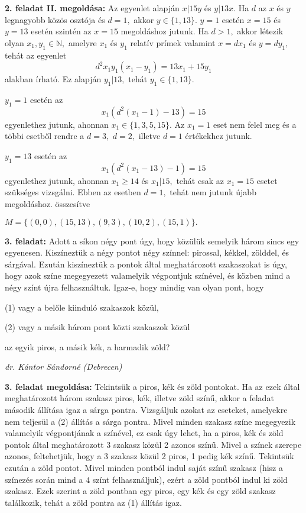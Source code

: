 \documentclass[a4paper,10pt]{article}
\def\ki#1#2{\hfill {\it #1 (#2)}\medskip}
\begin{document}
\textbf{2. feladat II. megoldása: } Az egyenlet alapján $x|15y$
és $y|13x.$ Ha $d$ az $x$ és $y$ legnagyobb közös osztója
és $d=1,$ akkor $y\in \{1,13\}.$ $y=1$ esetén $x=15$ és $y=13$
esetén szintén az $x=15$ megoldáshoz jutunk. Ha $d>1,$ akkor
létezik olyan $x_1,y_1\in \mathbb{N},$ amelyre $x_1$ és $y_1$
relatív prímek valamint  $x=dx_1$ és $y=dy_1,$ tehát az
egyenlet $$d^2x_1y_1(x_1-y_1)=13x_1+15y_1$$ alakban írható. Ez
alapján $y_1|13,$ tehát $y_1\in \{1,13\}.$

$y_1=1$ esetén az $$x_1\left(d^2(x_1-1)-13 \right )=15$$
egyenlethez jutunk, ahonnan $x_1\in \{1,3,5,15\}.$ Az $x_1=1$ eset
nem felel meg és a többi esetből rendre a $d=3,$ $d=2,$
illetve $d=1$ értékekhez jutunk.

$y_1=13$ esetén az $$x_1\left (d^2(x_1-13)-1 \right )=15$$
egyenlethez jutunk, ahonnan $x_1\geq 14$ és $x_1|15,$ tehát csak
az $x_1=15$ esetet szükséges vizsgálni. Ebben az esetben
$d=1,$ tehát nem jutunk újabb megoldáshoz. összesítve

\centerline{$M=\{(0,0),(15,13),(9,3),(10,2),(15,1)\}.$}

\medskip


{\bf 3. feladat: }  Adott a síkon négy pont úgy, hogy közülük semelyik három sincs egy egyenesen.
Kiszíneztük a négy pontot négy színnel: pirossal, kékkel, zölddel,
és sárgával. Ezután kiszíneztük a pontok által meghatá\-rozott
szaka\-szo\-kat is úgy, hogy azok színe megegyezett valamelyik
vég\-pont\-juk színével, és közben mind a négy színt újra
felhasználtuk. Igaz-e, hogy mindig van olyan pont, hogy

(1) vagy a belőle kiinduló szakaszok közül,

(2) vagy a másik három pont közti szakaszok közül

\noindent az egyik piros, a másik kék, a harmadik zöld?

\ki{dr. Kántor Sándorné}{Debrecen}\medskip

\textbf{3. feladat megoldása: } Tekintsük a piros, kék és zöld pontokat. Ha az ezek által
meghatározott három szakasz piros, kék, illetve zöld színű, akkor a
feladat második állítása igaz a sárga pontra. Vizsgáljuk azokat az
eseteket, amelyekre nem teljesül a (2) állítás a sárga pontra. Mivel
minden szakasz színe megegyezik valamelyik végpontjának a színével,
ez csak úgy lehet, ha a piros, kék és zöld pontok által
meghatározott 3 szakasz közül 2 azonos színű. Mivel a színek szerepe
azonos, feltehetjük, hogy a 3 szakasz közül 2 piros, 1 pedig kék
színű. Tekintsük ezután a zöld pontot. Mivel minden pontból indul
saját színű szakasz (hisz a színezés során mind a $4$ színt
felhasználjuk), ezért a zöld pontból indul ki zöld szakasz. Ezek
szerint a zöld pontban egy piros, egy kék és egy zöld szakasz
találkozik, tehát a zöld pontra az (1) állítás igaz.
\end{document}

